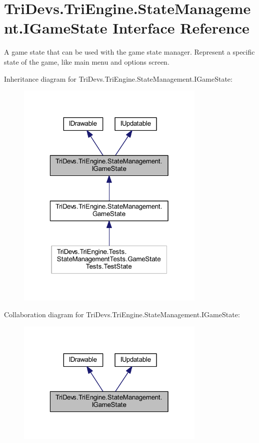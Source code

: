 \hypertarget{interface_tri_devs_1_1_tri_engine_1_1_state_management_1_1_i_game_state}{\section{Tri\-Devs.\-Tri\-Engine.\-State\-Management.\-I\-Game\-State Interface Reference}
\label{interface_tri_devs_1_1_tri_engine_1_1_state_management_1_1_i_game_state}
}


A game state that can be used with the game state manager. Represent a specific state of the game, like main menu and options screen.  




Inheritance diagram for Tri\-Devs.\-Tri\-Engine.\-State\-Management.\-I\-Game\-State\-:
\nopagebreak
\begin{figure}[H]
\begin{center}
\leavevmode
\includegraphics[width=256pt]{interface_tri_devs_1_1_tri_engine_1_1_state_management_1_1_i_game_state__inherit__graph}
\end{center}
\end{figure}


Collaboration diagram for Tri\-Devs.\-Tri\-Engine.\-State\-Management.\-I\-Game\-State\-:
\nopagebreak
\begin{figure}[H]
\begin{center}
\leavevmode
\includegraphics[width=256pt]{interface_tri_devs_1_1_tri_engine_1_1_state_management_1_1_i_game_state__coll__graph}
\end{center}
\end{figure}
